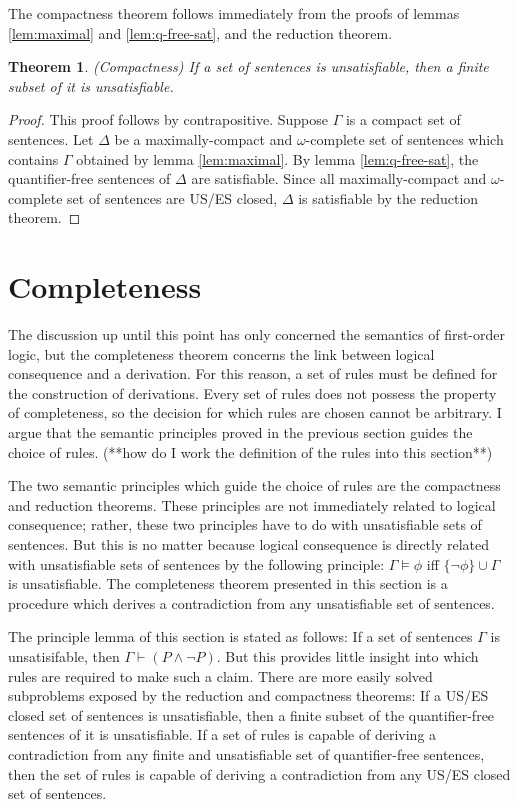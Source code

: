 \documentclass[12pt]{article}
\newtheorem{theorem}{Theorem}[section]
\theoremstyle{definition}
\theoremstyle{remark}
\begin{document}
The compactness theorem follows immediately from the proofs of lemmas \ref{lem:maximal} and \ref{lem:q-free-sat}, and the reduction theorem.

\begin{theorem}{\textnormal{(Compactness)}}
	If a set of sentences is unsatisfiable, then a finite subset of it is unsatisfiable.
\end{theorem}

\begin{proof}
	This proof follows by contrapositive. Suppose $\Gamma$ is a compact set of sentences. Let $\Delta$ be a maximally-compact and $\omega$-complete set of sentences which contains $\Gamma$ obtained by lemma \ref{lem:maximal}. By lemma \ref{lem:q-free-sat}, the quantifier-free sentences of $\Delta$ are satisfiable. Since all maximally-compact and $\omega$-complete set of sentences are US/ES closed, $\Delta$ is satisfiable by the reduction theorem.
\end{proof}

\section{Completeness}

The discussion up until this point has only concerned the semantics of first-order logic, but the completeness theorem concerns the link between logical consequence and a derivation. For this reason, a set of rules must be defined for the construction of derivations. Every set of rules does not possess the property of completeness, so the decision for which rules are chosen cannot be arbitrary. I argue that the semantic principles proved in the previous section guides the choice of rules. (**how do I work the definition of the rules into this section**)

The two semantic principles which guide the choice of rules are the compactness and reduction theorems. These principles are not immediately related to logical consequence; rather, these two principles have to do with unsatisfiable sets of sentences. But this is no matter because logical consequence is directly related with unsatisfiable sets of sentences by the following principle: $\Gamma \models \phi$ iff $\{ \neg\phi \} \cup \Gamma$ is unsatisfiable. The completeness theorem presented in this section is a procedure which derives a contradiction from any unsatisfiable set of sentences. 

The principle lemma of this section is stated as follows: If a set of sentences $\Gamma$ is unsatisifable, then $\Gamma \vdash (P \land \neg P)$. But this provides little insight into which rules are required to make such a claim. There are more easily solved subproblems exposed by the reduction and compactness theorems: If a US/ES closed set of sentences is unsatisfiable, then a finite subset of the quantifier-free sentences of it is unsatisfiable. If a set of rules is capable of deriving a contradiction from any finite and unsatisfiable set of quantifier-free sentences, then the set of rules is capable of deriving a contradiction from any US/ES closed set of sentences.
\end{document}
